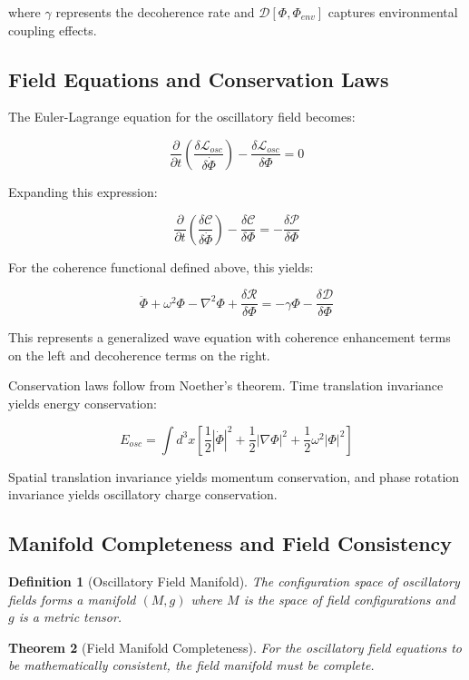 \documentclass[11pt]{article}
\newtheorem{theorem}{Theorem}[section]
\newtheorem{definition}[theorem]{Definition}
\theoremstyle{remark}
\begin{document}
where $\gamma$ represents the decoherence rate and $\mathcal{D}[\Phi, \Phi_{env}]$ captures environmental coupling effects.

\subsection{Field Equations and Conservation Laws}

The Euler-Lagrange equation for the oscillatory field becomes:

$$\frac{\partial}{\partial t}\left(\frac{\delta \mathcal{L}_{osc}}{\delta \dot{\Phi}}\right) - \frac{\delta \mathcal{L}_{osc}}{\delta \Phi} = 0$$

Expanding this expression:

$$\frac{\partial}{\partial t}\left(\frac{\delta \mathcal{C}}{\delta \dot{\Phi}}\right) - \frac{\delta \mathcal{C}}{\delta \Phi} = -\frac{\delta \mathcal{P}}{\delta \Phi}$$

For the coherence functional defined above, this yields:

$$\ddot{\Phi} + \omega^2\Phi - \nabla^2\Phi + \frac{\delta \mathcal{R}}{\delta \Phi} = -\gamma\Phi - \frac{\delta \mathcal{D}}{\delta \Phi}$$

This represents a generalized wave equation with coherence enhancement terms on the left and decoherence terms on the right.

Conservation laws follow from Noether's theorem. Time translation invariance yields energy conservation:

$$E_{osc} = \int d^3x \left[\frac{1}{2}|\dot{\Phi}|^2 + \frac{1}{2}|\nabla\Phi|^2 + \frac{1}{2}\omega^2|\Phi|^2\right]$$

Spatial translation invariance yields momentum conservation, and phase rotation invariance yields oscillatory charge conservation.

\subsection{Manifold Completeness and Field Consistency}

\begin{definition}[Oscillatory Field Manifold]
The configuration space of oscillatory fields forms a manifold $(M, g)$ where $M$ is the space of field configurations and $g$ is a metric tensor.
\end{definition}

\begin{theorem}[Field Manifold Completeness]
For the oscillatory field equations to be mathematically consistent, the field manifold must be complete.
\end{theorem}
\end{document}
